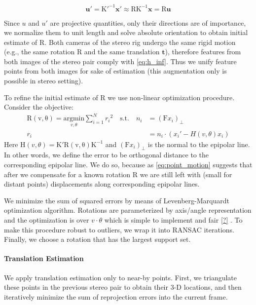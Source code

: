 \documentclass{bmvc2k}
\begin{document}
\begin{equation}
  \mathbf{u'} = \mathrm{K'^{-1}}\mathbf{x}' \approx \mathrm{RK^{-1}}\mathbf{x} = \mathrm{R}\mathbf{u}
\end{equation}

Since $u$ and $u'$ are projective quantities, only their directions
are of importance, we normalize them to unit length and solve absolute
orientation \cite{Horn1987} to obtain initial estimate of
$\mathrm{R}$. Both cameras of the stereo rig undergo the same rigid
motion (e.g., the same rotation $\mathrm{R}$ and the same translation
$\mathbf{t}$), therefore features from both images of the stereo pair
comply with \ref{eq:h_inf}. Thus we unify feature points from both
images for sake of estimation (this augmentation only is possible in
stereo setting).

To refine the initial estimate of $\mathrm{R}$ we use non-linear
optimization procedure.  Consider the objective:
\begin{equation}
  \begin{split}
    \mathrm{R(v,\theta)} = \underset{v,\theta}{\mathrm{argmin}}
    \sum_{i=1}^N{r_i}^2\quad \text{s.t.}\quad n_i &=
    (\mathrm{F}x_i)_\perp \\ r_i&=n_i\cdot (x_i'-H(v,\theta)x_i)
  \end{split}
\end{equation}
Here $\mathrm{H}(v,\theta) = \mathrm{K'R(v,\theta)K^{-1}}$ and
$(\mathrm{F}x_i)_\perp$ is the normal to the epipolar line.  In other
words, we define the error to be orthogonal distance to the
corresponding epipolar line.  We do so, because as
\ref{eq:point_motion} suggests that after we compensate for a known
rotation $\mathrm{R}$ we are still left with (small for distant
points) displacements along corresponding epipolar lines.

We minimize the sum of squared errors by means of Levenberg-Marquardt
optimization algorithm. Rotations are parameterized by axis/angle
representation and the optimization is over $v\cdot \theta$ which is
simple to implement and fair \ref{?} . To make this procedure robust
to outliers, we wrap it into RANSAC iterations.  Finally, we choose a
rotation that has the largest support set.

\paragraph{Translation Estimation} We apply translation estimation
only to near-by points.  First, we triangulate these points in the
previous stereo pair to obtain their 3-D locations, and then
iteratively minimize the sum of reprojection errors into the current
frame.
\end{document}
